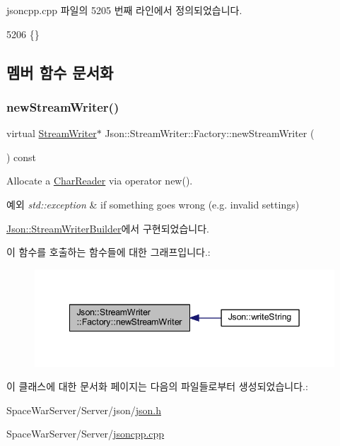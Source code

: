 jsoncpp.\+cpp 파일의 5205 번째 라인에서 정의되었습니다.


\begin{DoxyCode}
5206 \{\}
\end{DoxyCode}


\subsection{멤버 함수 문서화}
\mbox{\label{class_json_1_1_stream_writer_1_1_factory_a9d30ec53e8288cd53befccf1009c5f31}} 
\subsubsection{\texorpdfstring{new\+Stream\+Writer()}{newStreamWriter()}}
{\footnotesize\ttfamily virtual \hyperlink{class_json_1_1_stream_writer}{Stream\+Writer}$\ast$ Json\+::\+Stream\+Writer\+::\+Factory\+::new\+Stream\+Writer (\begin{DoxyParamCaption}{ }\end{DoxyParamCaption}) const\hspace{0.3cm}{\ttfamily [pure virtual]}}



Allocate a \hyperlink{class_json_1_1_char_reader}{Char\+Reader} via operator new(). 


\begin{DoxyExceptions}{예외}
{\em std\+::exception} & if something goes wrong (e.\+g. invalid settings) \\
\hline
\end{DoxyExceptions}


\hyperlink{class_json_1_1_stream_writer_builder_ab9ee278609f88ae04a7c1a84e1f559e6}{Json\+::\+Stream\+Writer\+Builder}에서 구현되었습니다.

이 함수를 호출하는 함수들에 대한 그래프입니다.\+:\nopagebreak
\begin{figure}[H]
\begin{center}
\leavevmode
\includegraphics[width=342pt]{class_json_1_1_stream_writer_1_1_factory_a9d30ec53e8288cd53befccf1009c5f31_icgraph}
\end{center}
\end{figure}


이 클래스에 대한 문서화 페이지는 다음의 파일들로부터 생성되었습니다.\+:\begin{DoxyCompactItemize}
\item 
Space\+War\+Server/\+Server/json/\hyperlink{json_8h}{json.\+h}\item 
Space\+War\+Server/\+Server/\hyperlink{jsoncpp_8cpp}{jsoncpp.\+cpp}\end{DoxyCompactItemize}
